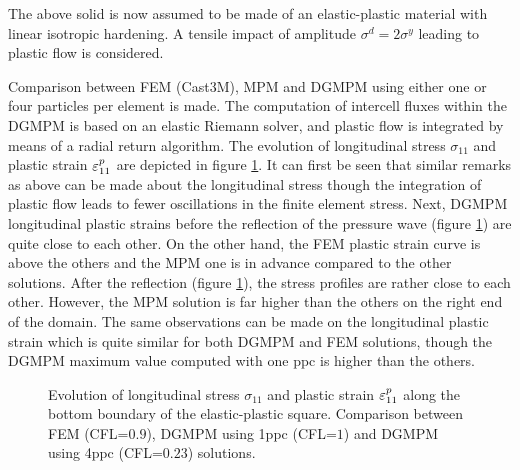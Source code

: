 The above solid is now assumed to be made of an elastic-plastic material with linear isotropic hardening. A tensile impact of amplitude $\sigma^d=2\sigma^y$ leading to plastic flow is considered. 

Comparison between FEM (Cast3M), MPM and DGMPM using either one or four particles per element is made.
The computation of intercell fluxes within the DGMPM is based on an elastic Riemann solver, and plastic flow is integrated by means of a radial return algorithm.
The evolution of longitudinal stress $\sigma_{11}$ and plastic strain $\varepsilon^p_{11}$ are depicted in figure \ref{fig:elastlines_stress}.
It can first be seen that similar remarks as above can be made about the longitudinal stress though the integration of plastic flow leads to fewer oscillations in the finite element stress.
Next, DGMPM longitudinal plastic strains before the reflection of the pressure wave (figure \ref{fig:elastlines_stress}) are quite close to each other.
On the other hand, the FEM plastic strain curve is above the others and the MPM one is in advance compared to the other solutions.
After the reflection (figure \ref{fig:elastlines_stress}), the stress profiles are rather close to each other.
However, the MPM solution is far higher than the others on the right end of the domain.
The same observations can be made on the longitudinal plastic strain which is quite similar for both DGMPM and FEM solutions, though the DGMPM maximum value computed with one ppc is higher than the others.

\begin{figure}[h!]
  { \label{subfig:2dplast1}}
  { \label{subfig:2dplast2}}
  
  \caption{Evolution of longitudinal stress $\sigma_{11}$ and plastic strain $\varepsilon^p_{11}$ along the bottom boundary of the elastic-plastic square. Comparison between FEM (CFL=$0.9$), DGMPM using 1ppc (CFL=$1$) and DGMPM using 4ppc (CFL=$0.23$) solutions.}
  \label{fig:elastlines_stress}
\end{figure}

